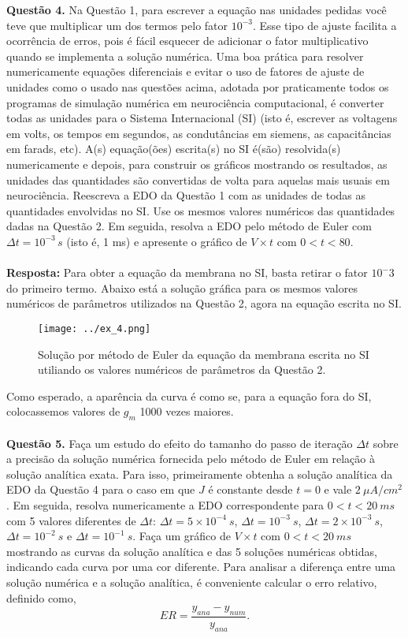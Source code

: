 \documentclass[portuguese,12pt,a4paper]{article}
\begin{document}
	\noindent\textbf{Questão 4.} Na Questão 1, para escrever a equação nas unidades pedidas você teve que multiplicar um dos termos pelo fator $10^{-3}$. Esse tipo de ajuste facilita a ocorrência de erros, pois é fácil esquecer de adicionar o fator multiplicativo quando se implementa a solução numérica. Uma boa prática para resolver numericamente equações diferenciais e evitar o uso de fatores de ajuste de unidades como o usado nas questões acima, adotada por praticamente todos os programas de simulação numérica em neurociência computacional, é converter todas as unidades para o Sistema Internacional (SI) (isto é, escrever as voltagens em volts, os tempos em segundos, as condutâncias em siemens, as capacitâncias em farads, etc). A(s) equação(ões) escrita(s) no SI é(são) resolvida(s) numericamente e depois, para construir os gráficos mostrando os resultados, as unidades das quantidades são convertidas de volta para aquelas mais usuais em neurociência. Reescreva a EDO da Questão 1 com as unidades de todas as quantidades envolvidas no SI. Use os mesmos valores numéricos das quantidades dadas na Questão 2. Em seguida, resolva a EDO pelo método de Euler com $\Delta t = 10^{-3}\,s$ (isto é, 1 ms) e apresente o gráfico de $V \times t$ com $0 < t < 80$.
	\\\\
	
	
	\noindent\textbf{Resposta:} Para obter a equação da membrana no SI, basta retirar o fator $10^-3$ do primeiro termo. Abaixo está a solução gráfica para os mesmos valores numéricos de parâmetros utilizados na Questão 2, agora na equação escrita no SI.
	
	\begin{figure}[H]
		\centering
		\texttt{[image: ../ex\_4.png]}
		\caption{Solução por método de Euler da equação da membrana escrita no SI utiliando os valores numéricos de parâmetros da Questão 2.}
	\end{figure}
	
	Como esperado, a aparência da curva é como se, para a equação fora do SI, colocassemos valores de $g_m$ 1000 vezes maiores.\\\\
	
	\noindent\textbf{Questão 5.} Faça um estudo do efeito do tamanho do passo de iteração $\Delta t$ sobre a precisão da solução numérica fornecida pelo método de Euler em relação à solução analítica exata. Para isso, primeiramente obtenha a solução analítica da EDO da Questão 4 para o caso em que $J$ é constante desde $t=0$ e vale $2~\mu A/cm^2$. Em seguida, resolva numericamente a EDO correspondente para $0 < t < 20~ms$ com 5 valores diferentes de $\Delta t$: $\Delta t = 5 \times 10^{-4}~s$, $\Delta t = 10^{-3}~s$, $\Delta t = 2 \times 10^{-3}~s$, $\Delta t = 10^{-2}~s$ e $\Delta t = 10^{-1}~s$. Faça um gráfico de $V \times t$ com $0 < t < 20~ms$ mostrando as curvas da solução analítica e das 5 soluções numéricas obtidas, indicando cada curva por uma cor diferente. Para analisar a diferença entre uma solução numérica e a solução analítica, é conveniente calcular o erro relativo, definido como,
	\[
	ER = \frac{y_{ana} - y_{num}}{y_{ana}}.
	\]
	
\end{document}
